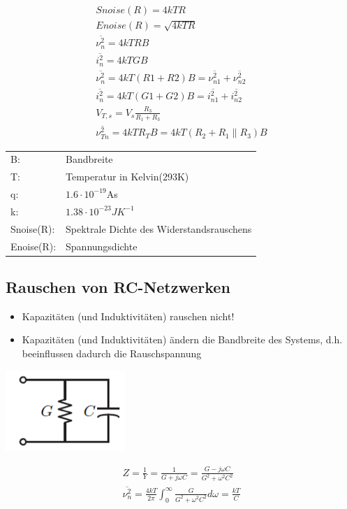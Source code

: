 \begin{minipage}{9cm}
\begin{gather}
Snoise(R)=4kTR\\
Enoise(R)=\sqrt{4kTR}\\
\overline{\nu^2_{n}}=4kTRB\\
\overline{i^2_{n}}=4kTGB\\
\overline{\nu^2_{n}}=4kT(R1+R2)B=\overline{\nu^2_{n1}}+\overline{\nu^2_{n2}}\\
\overline{i^2_{n}}=4kT(G1+G2)B=\overline{i^2_{n1}}+\overline{i^2_{n2}}\\
V_{T,s}=V_{s}\frac{R_{3}}{R_{1}+R_{3}}\\
\overline{\nu^2_{Tn}}=4kTR_{T}B=4kT(R_{2}+R_{1}\parallel R_{3})B
\end{gather}
\begin{tabular}{ll}
B:&Bandbreite\\
T:&Temperatur in Kelvin(293K)\\
q:&$1.6 \cdot 10^{-19}$As\\
k:&$1.38 \cdot 10^{-23}JK^{-1}$\\
Snoise(R):&Spektrale Dichte des Widerstandsrauschens\\
Enoise(R):&Spannungsdichte
\end{tabular}
\end{minipage}

\subsection{Rauschen von RC-Netzwerken}
\begin{itemize}
  \item Kapazitäten (und Induktivitäten) rauschen nicht!
  \item Kapazitäten (und Induktivitäten) ändern die Bandbreite des Systems, d.h.
  beeinflussen dadurch die Rauschspannung
\end{itemize}
\begin{minipage}{9cm}
\includegraphics[scale=0.4]{pictures/rcnetzwerk}
\end{minipage}
\begin{minipage}{9cm}
\begin{gather}
Z=\frac{1}{Y}=\frac{1}{G+j\omega C}=\frac{G-j\omega C}{G^2+\omega^2C^2}\\
\overline{\nu^2_{n}}=\frac{4kT}{2\pi}\int^{\infty}_{0}\frac{G}{G^2+\omega^2C^2}d\omega=\frac{kT}{C}
\end{gather}
\end{minipage}

